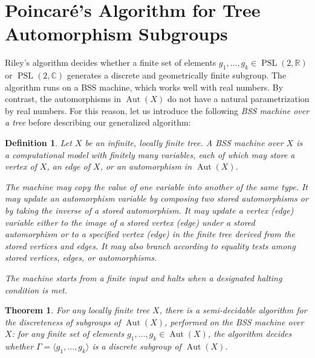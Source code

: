 \documentclass[12pt,leqno]{amsart}
\newcommand{\2}{L^2_{\rm per}(0, T)}
\newtheorem{thm}{Theorem}[section]
\newtheorem{defn}{Definition}[section]
\newcommand{\aut}{{\operatorname{Aut}}}
\newcommand{\psl}{{\operatorname{PSL}}}
\numberwithin{equation}{section}
\numberwithin{figure}{section}
\begin{document}
\section{Poincar\'e's Algorithm for Tree Automorphism Subgroups}\label{sec:Poincare}
Riley's algorithm \cite{riley1983applications} decides whether a finite set of elements $g_1,\dots, g_k\in \psl(2,\mathbb{R})$ or $\psl(2,\mathbb{C})$ generates a discrete and geometrically finite subgroup. The algorithm runs on a BSS machine, which works well with real numbers. By contrast, the automorphisms in $\aut(X)$ do not have a natural parametrization by real numbers. For this reason, let us introduce the following \emph{BSS machine over a tree} before describing our generalized algorithm:
\begin{defn}
    Let $X$ be an infinite, locally finite tree. A \emph{BSS machine over $X$} is a computational model with finitely many variables, each of which may store a vertex of $X$, an edge of $X$, or an automorphism in $\aut(X)$.

    The machine may copy the value of one variable into another of the same type. It may update an automorphism variable by composing two stored automorphisms or by taking the inverse of a stored automorphism. It may update a vertex (edge) variable either to the image of a stored vertex (edge) under a stored automorphism or to a specified vertex (edge) in the finite tree derived from the stored vertices and edges. It may also branch according to equality tests among stored vertices, edges, or automorphisms.

    The machine starts from a finite input and halts when a designated halting condition is met.
\end{defn}
\begin{thm}\label{thm:algorithm}
    For any locally finite tree $X$, there is a semi-decidable algorithm for the discreteness of subgroups of $\aut(X)$, performed on the BSS machine over $X$: for any finite set of elements $g_1,\dots, g_k\in \aut(X)$, the algorithm decides whether $\Gamma = \langle g_1,\dots, g_k\rangle$ is a discrete subgroup of $\aut(X)$.
\end{thm}
\end{document}
